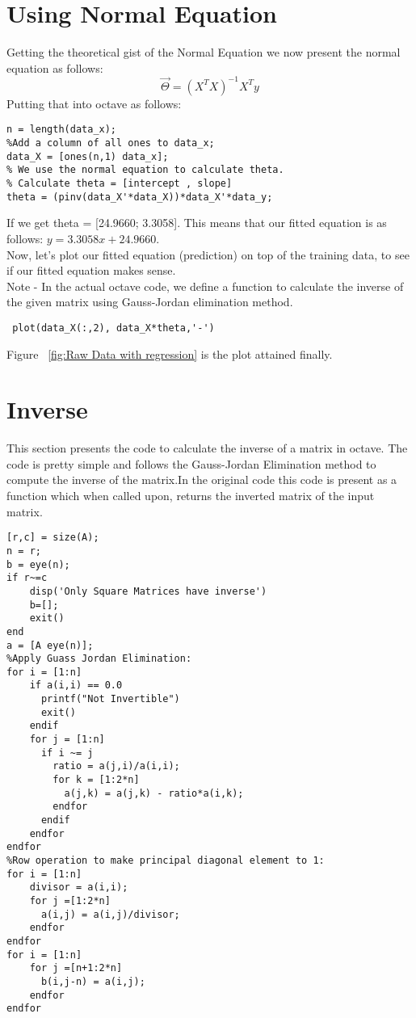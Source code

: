 \documentclass[a4paper, 12pt]{report}
\begin{document}
\section{Using Normal Equation}
Getting the theoretical gist of the Normal Equation we now present the normal equation as follows:
\begin{equation}
    \Vec{\Theta} = (X^{T} X)^{-1} X^{T} y
\end{equation} 
Putting that into octave as follows:
\begin{lstlisting}[caption={Using the normal equation}]
% We want to allow a non-zero intercept for our linear equation. So we add a column of all ones to our x column.
n = length(data_x);
%Add a column of all ones to data_x;
data_X = [ones(n,1) data_x];
% We use the normal equation to calculate theta.
% Calculate theta = [intercept , slope]
theta = (pinv(data_X'*data_X))*data_X'*data_y; 
\end{lstlisting}
If we get theta = [24.9660; 3.3058]. This means that our fitted equation is as follows: $y = 3.3058x + 24.9660$.\\
Now, let's plot our fitted equation (prediction) on top of the training data, to see if our fitted equation makes sense.\\
Note - In the actual octave code, we define a function to calculate the inverse of the given matrix using Gauss-Jordan elimination method.
\begin{lstlisting}[caption={Plotting using Linear Regression}]
% Plot the fitted equation we got from the regression
 plot(data_X(:,2), data_X*theta,'-')
\end{lstlisting}
Figure ~\ref{fig:Raw Data with regression} is the plot attained finally.
\section{Inverse}
This section presents the code to calculate the inverse of a matrix in octave. The code is pretty simple and follows the Gauss-Jordan Elimination method to compute the inverse of the matrix.In the original code this code is present as a function which when called upon, returns the inverted matrix of the input matrix.
\begin{lstlisting}[caption={Inverse using Gauss-Jordan Elimination}]
%Finding dimensions of the matrix:
[r,c] = size(A);
n = r;
b = eye(n);
if r~=c
    disp('Only Square Matrices have inverse')
    b=[];
    exit()
end
a = [A eye(n)];
%Apply Guass Jordan Elimination:
for i = [1:n]
    if a(i,i) == 0.0
      printf("Not Invertible")
      exit()
    endif
    for j = [1:n]
      if i ~= j
        ratio = a(j,i)/a(i,i);
        for k = [1:2*n]
          a(j,k) = a(j,k) - ratio*a(i,k);
        endfor
      endif
    endfor
endfor
%Row operation to make principal diagonal element to 1:
for i = [1:n]
    divisor = a(i,i);
    for j =[1:2*n]
      a(i,j) = a(i,j)/divisor;
    endfor
endfor
for i = [1:n]
    for j =[n+1:2*n]
      b(i,j-n) = a(i,j);
    endfor
endfor
\end{lstlisting}
\end{document}
